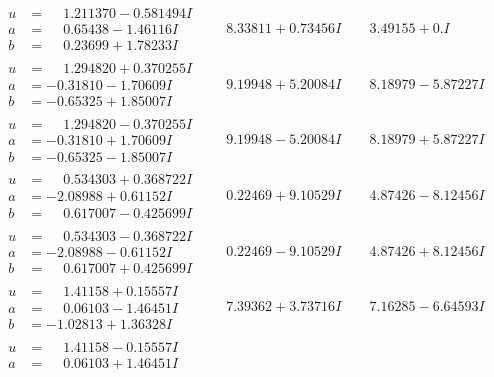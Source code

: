 \documentclass[1p]{elsarticle_modified}
\theoremstyle{definition}
\begin{document}
$$\begin{array}{c|c|c}
\begin{aligned}
u &= \phantom{-}1.211370 - 0.581494 I \\
a &= \phantom{-}0.65438 - 1.46116 I \\
b &= \phantom{-}0.23699 + 1.78233 I\end{aligned}
 & \phantom{-}8.33811 + 0.73456 I & \phantom{-}3.49155 + 0. I\phantom{ +0.000000I} \\ \hline\begin{aligned}
u &= \phantom{-}1.294820 + 0.370255 I \\
a &= -0.31810 - 1.70609 I \\
b &= -0.65325 + 1.85007 I\end{aligned}
 & \phantom{-}9.19948 + 5.20084 I & \phantom{-}8.18979 - 5.87227 I \\ \hline\begin{aligned}
u &= \phantom{-}1.294820 - 0.370255 I \\
a &= -0.31810 + 1.70609 I \\
b &= -0.65325 - 1.85007 I\end{aligned}
 & \phantom{-}9.19948 - 5.20084 I & \phantom{-}8.18979 + 5.87227 I \\ \hline\begin{aligned}
u &= \phantom{-}0.534303 + 0.368722 I \\
a &= -2.08988 + 0.61152 I \\
b &= \phantom{-}0.617007 - 0.425699 I\end{aligned}
 & \phantom{-}0.22469 + 9.10529 I & \phantom{-}4.87426 - 8.12456 I \\ \hline\begin{aligned}
u &= \phantom{-}0.534303 - 0.368722 I \\
a &= -2.08988 - 0.61152 I \\
b &= \phantom{-}0.617007 + 0.425699 I\end{aligned}
 & \phantom{-}0.22469 - 9.10529 I & \phantom{-}4.87426 + 8.12456 I \\ \hline\begin{aligned}
u &= \phantom{-}1.41158 + 0.15557 I \\
a &= \phantom{-}0.06103 - 1.46451 I \\
b &= -1.02813 + 1.36328 I\end{aligned}
 & \phantom{-}7.39362 + 3.73716 I & \phantom{-}7.16285 - 6.64593 I \\ \hline\begin{aligned}
u &= \phantom{-}1.41158 - 0.15557 I \\
a &= \phantom{-}0.06103 + 1.46451 I \\

\end{aligned}
\end{array}$$
\end{document}
